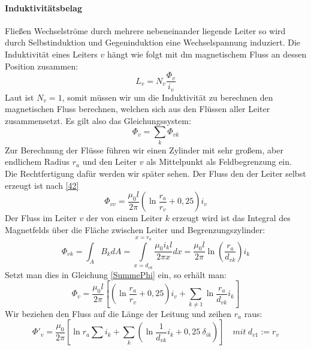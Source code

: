 \documentclass[10pt,a4paper]{article}
\begin{document}
\paragraph{Induktivitätsbelag}
Fließen Wechselströme durch mehrere nebeneinander liegende Leiter so wird durch Selbstinduktion und Gegeninduktion eine Wechselspannung induziert.
Die Induktivität eines Leiters $v$ hängt wie folgt mit dm magnetischem Fluss an dessen Position zusammen:
\begin{equation}
L_v = N_v \frac{\Phi_v}{i_v}
\end{equation}
Laut \cite{Flosdorff} %
ist $N_v = 1$, somit müssen wir um die Induktivität zu berechnen den magnetischen Fluss berechnen, welchen sich aus den Flüssen aller Leiter zusammensetzt. Es gilt also das Gleichungssystem:
\begin{equation}\label{SummePhi}
\Phi_v = \sum_k \Phi_{vk}
\end{equation}
Zur Berechnung der Flüsse führen wir einen Zylinder mit sehr großem, aber endlichem Radius $r_a$ und den Leiter $v$ als Mittelpunkt als Feldbegrenzung ein. Die Rechtfertigung dafür werden wir später sehen.
Der Fluss den der Leiter selbst erzeugt ist nach \ref{42}
\begin{equation}
\Phi_{vv} = \frac{\mu_0l}{2\pi} \left( \ln\frac{r_a}{r_v} + 0,25 \right) i_v
\end{equation}
Der Fluss im Leiter $v$ der von einem Leiter $k$ erzeugt wird ist das Integral des Magnetfelds über die Fläche zwischen Leiter und Begrenzungszylinder:
\begin{equation}
\Phi_{vk} = \int_A B_k dA = \int\limits_{x=d_{vk}}^{x=r_a} \frac{\mu_0i_k l}{2\pi x}dx =
\frac{\mu_0l}{2\pi}\ln\left(\frac{r_a}{d_{vk}}\right) i_k
\end{equation}
Setzt man dies in Gleichung \ref{SummePhi} ein, so erhält man:
\begin{equation}
\Phi_v = \frac{\mu_0l}{2\pi} \left[ \left( \ln\frac{r_a}{r_v} +0,25\right) i_v + \sum_{k\neq1}\ln\frac{r_a}{d_{vk}} i_k \right]
\end{equation}
Wir beziehen den Fluss auf die Länge der Leitung und zeihen $r_a$ raus:
\begin{equation}
\Phi'_v = \frac{\mu_0}{2\pi}
 \left[
   \ln r_a \sum i_k +
   \sum_k \left( \ln\frac{1}{d_{vk}} i_k +
   0,25 \: \delta_{ik} \right)
 \right]
\quad mit \: d_{v1}:=r_v
\end{equation}
\end{document}
